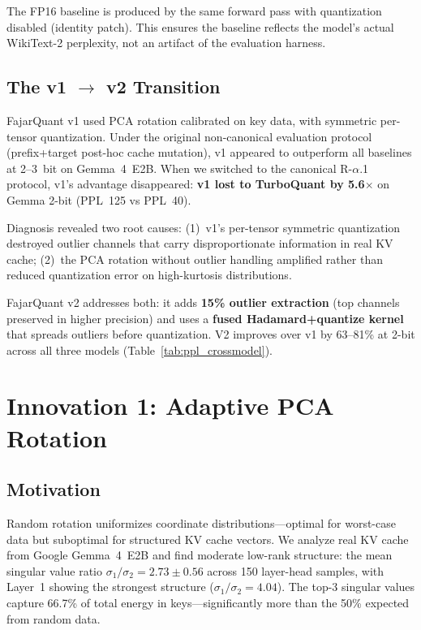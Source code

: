 \documentclass[10pt,twocolumn]{article}
\begin{document}
The FP16 baseline is produced by the same forward pass with
quantization disabled (identity patch). This ensures the baseline
reflects the model's actual WikiText-2 perplexity, not an artifact
of the evaluation harness.

\subsection{The v1 $\to$ v2 Transition}
\label{sec:v1v2}

FajarQuant v1 used PCA rotation calibrated on key data, with symmetric
per-tensor quantization. Under the original non-canonical evaluation
protocol (prefix+target post-hoc cache mutation), v1 appeared to
outperform all baselines at 2--3~bit on Gemma~4~E2B. When we switched
to the canonical R-$\alpha$.1 protocol, v1's advantage disappeared:
\textbf{v1 lost to TurboQuant by 5.6$\times$} on Gemma 2-bit
(PPL~125 vs PPL~40).

Diagnosis revealed two root causes: (1)~v1's per-tensor symmetric
quantization destroyed outlier channels that carry disproportionate
information in real KV cache; (2)~the PCA rotation without outlier
handling amplified rather than reduced quantization error on high-kurtosis
distributions.

FajarQuant v2 addresses both: it adds \textbf{15\% outlier extraction}
(top channels preserved in higher precision) and uses a \textbf{fused
Hadamard+quantize kernel} that spreads outliers before quantization.
V2 improves over v1 by 63--81\% at 2-bit across all three models
(Table~\ref{tab:ppl_crossmodel}).

\section{Innovation 1: Adaptive PCA Rotation}

\subsection{Motivation}

Random rotation uniformizes coordinate distributions---optimal for worst-case data but suboptimal for structured KV cache vectors. We analyze real KV cache from Google Gemma~4~E2B and find moderate low-rank structure: the mean singular value ratio $\sigma_1/\sigma_2 = 2.73 \pm 0.56$ across 150 layer-head samples, with Layer~1 showing the strongest structure ($\sigma_1/\sigma_2 = 4.04$). The top-3 singular values capture 66.7\% of total energy in keys---significantly more than the 50\% expected from random data.
\end{document}
